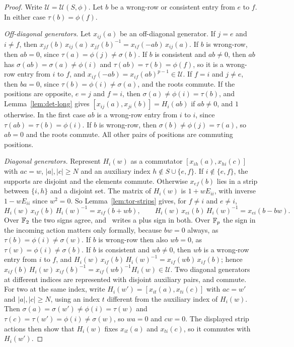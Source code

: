 \begin{proof}
Write $\mathcal U=\mathcal U(S,\phi)$. Let $b$ be a wrong-row or consistent entry from $e$ to $f$. In either case
$\tau(b)=\phi(f)$.

\emph{Off-diagonal generators.} Let $x_{ij}(a)$ be an off-diagonal generator. If $j=e$ and $i\neq f$, then
$x_{jf}(b)\,x_{ij}(a)\,x_{jf}(b)^{-1}=x_{if}(-ab)\,x_{ij}(a)$. If $b$ is wrong-row, then $ab=0$, since
$\tau(a)=\phi(j)\neq\sigma(b)$. If $b$ is consistent and $ab\neq0$, then $ab$ has $\sigma(ab)=\sigma(a)\neq\phi(i)$ and
$\tau(ab)=\tau(b)=\phi(f)$, so it is a wrong-row entry from $i$ to $f$, and $x_{if}(-ab)=x_{if}(ab)^{p-1}\in\mathcal U$.
If $f=i$ and $j\neq e$, then $ba=0$, since $\tau(b)=\phi(i)\neq\sigma(a)$, and the roots commute. If the positions are
opposite, $e=j$ and $f=i$, then $\sigma(a)\neq\phi(i)=\tau(b)$, and Lemma~\ref{lem:det-long} gives
$[x_{ij}(a),x_{ji}(b)]=H_i(ab)$ if $ab\neq0$, and $1$ otherwise. In the first case $ab$ is a wrong-row entry from $i$ to
$i$, since $\tau(ab)=\tau(b)=\phi(i)$. If $b$ is wrong-row, then $\sigma(b)\neq\phi(j)=\tau(a)$, so $ab=0$ and the roots
commute. All other pairs of positions are commuting positions.

\emph{Diagonal generators.} Represent $H_i(w)$ as a commutator $[x_{ih}(a),x_{hi}(c)]$ with $ac=w$, $|a|,|c|\geq N$ and an
auxiliary index $h\notin S\cup\{e,f\}$. If $i\notin\{e,f\}$, the supports are disjoint and the elements commute. Otherwise
$x_{ef}(b)$ lies in a strip between $\{i,h\}$ and a disjoint set. The matrix of $H_i(w)$ is $1+wE_{ii}$, with inverse
$1-wE_{ii}$ since $w^2=0$. So Lemma~\ref{lem:tor-strips} gives, for $f\neq i$ and $e\neq i$,
\[
 H_i(w)\,x_{if}(b)\,H_i(w)^{-1}=x_{if}(b+wb),\qquad H_i(w)\,x_{ei}(b)\,H_i(w)^{-1}=x_{ei}(b-bw).
\]
Over $\mathbb F_2$ the two signs agree, and~\cite{OAI247rf} writes a plus sign in both. Over $\mathbb F_p$ the sign in the incoming
action matters only formally, because $bw=0$ always, as $\tau(b)=\phi(i)\neq\sigma(w)$. If $b$ is wrong-row then also $wb=0$, as $\tau(w)=\phi(i)\neq\sigma(b)$.
If $b$ is consistent and $wb\neq0$, then $wb$ is a wrong-row entry from $i$ to $f$, and $H_i(w)\,x_{if}(b)\,H_i(w)^{-1}=
x_{if}(wb)\,x_{if}(b)$; hence $x_{if}(b)\,H_i(w)\,x_{if}(b)^{-1}=x_{if}(wb)^{-1}H_i(w)\in\mathcal U$. Two diagonal
generators at different indices are represented with disjoint auxiliary pairs, and commute. For two at the same index,
write $H_i(w')=[x_{it}(a),x_{ti}(c)]$ with $ac=w'$ and $|a|,|c|\geq N$, using an index $t$ different from the auxiliary
index of $H_i(w)$. Then $\sigma(a)=\sigma(w')\neq\phi(i)=\tau(w)$ and $\tau(c)=\tau(w')=\phi(i)\neq\sigma(w)$, so $wa=0$ and
$cw=0$. The displayed strip actions then show that $H_i(w)$ fixes $x_{it}(a)$ and $x_{ti}(c)$, so it commutes with
$H_i(w')$.


\end{proof}
